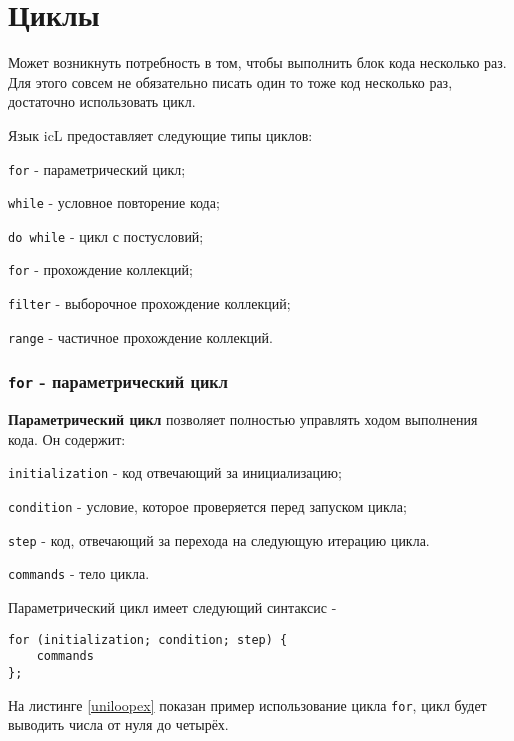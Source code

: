 \section{Циклы}

Может возникнуть потребность в том, чтобы выполнить блок кода несколько раз. Для этого совсем не обязательно писать один то тоже код несколько раз, достаточно использовать цикл.

Язык icL предоставляет следующие типы циклов:

\begin{icItems}
\item
	\texttt{for} - параметрический цикл;
\item
	\texttt{while} - условное повторение кода;
\item
	\texttt{do while} - цикл с постусловий;
\item
	\texttt{for} - прохождение коллекций;
\item
	\texttt{filter} - выборочное прохождение коллекций;
\item
	\texttt{range} - частичное прохождение коллекций.
\end{icItems}


\subsubsection{\texttt{for} - параметрический цикл}

{\bf Параметрический цикл} позволяет полностью управлять ходом выполнения кода. Он содержит:

\begin{icItems}
\item
	\texttt{initialization} - код отвечающий за инициализацию;
\item
	\texttt{condition} - условие, которое проверяется перед запуском цикла;
\item
	\texttt{step} - код, отвечающий за перехода на следующую итерацию цикла.
\item
	\texttt{commands} - тело цикла.
\end{icItems}

Параметрический цикл имеет следующий синтаксис -
\begin{verbatim}
for (initialization; condition; step) {
	commands
};
\end{verbatim}

На листинге \ref{uniloopex} показан пример использование цикла \texttt{for}, цикл будет выводить числа от нуля до четырёх.

